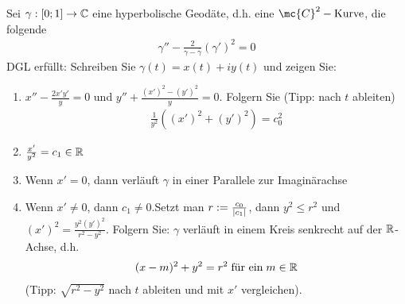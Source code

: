 \documentclass[ngerman]{report}
\begin{document}
\newpage
\begin{question}
    Sei $\gamma: [0;1] \to \mathbb{C}$ eine hyperbolische Geodäte, d.h. eine $\mc{C}^2-\text{Kurve}$, die folgende
    \begin{align*}
        \gamma'' - \frac{2}{\gamma-\overline{\gamma}}(\gamma')^2=0
    \end{align*}
    DGL erfüllt: Schreiben Sie $\gamma(t)=x(t)+iy(t)$ und zeigen Sie:
    \begin{enumerate}
        \item $x'' - \frac{2x'y'}{y}=0$ und $y'' + \frac{(x')^2-(y')^2}{y} = 0$. Folgern Sie (Tipp: nach $t$ ableiten)
        \begin{align}
            \frac{1}{y^2}\left((x')^2+(y')^2\right) = c_0^2\label{eq:3-1}
        \end{align}
        \item $\frac{x'}{y^2} = c_1 \in \mathbb{R}$
        \item Wenn $x' = 0$, dann verläuft $\gamma$ in einer Parallele zur Imaginärachse
        \item Wenn $x'\neq 0$, dann $c_1\neq 0$.Setzt man $r:=\frac{c_0}{\left|c_1\right|}$, dann $y^2\leq r^2$ und $(x')^2 = \frac{y^2(y')^2}{r^2-y^2}$. Folgern Sie: $\gamma$ verläuft in einem Kreis senkrecht auf der $\mathbb{R}$-Achse, d.h.
        \begin{align*}
            (x-m)^2+y^2=r^2 \;\text{für ein}\; m\in\mathbb{R}
        \end{align*}
        (Tipp: $\sqrt{r^2 - y^2}$ nach $t$ ableiten und mit $x'$ vergleichen).
    \end{enumerate}
\end{question}
\end{document}
